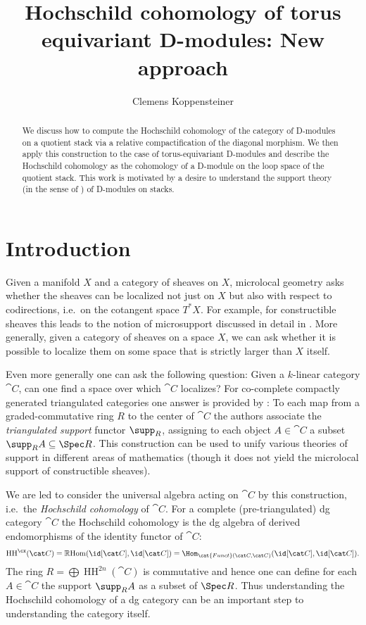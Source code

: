 \documentclass{ck-article}
\title{Hochschild cohomology of torus equivariant D-modules: New approach}
\author{Clemens Koppensteiner}
\newcommand{\HCoh}{\operatorname{HH}^\cx}   %
\begin{document}
\maketitle

\begin{abstract}
    We discuss how to compute the Hochschild cohomology of the category of D-modules on a quotient stack via a relative compactification of the diagonal morphism.
    We then apply this construction to the case of torus-equivariant D-modules and describe the Hochschild cohomology as the cohomology of a D-module on the loop space of the quotient stack.
    This work is motivated by a desire to understand the support theory (in the sense of \cite{BensonIyengarKrause:2008:LocalCohomologyAndSupportForTriangulatedCategories}) of D-modules on stacks.
\end{abstract}

\setcounter{tocdepth}{1}
\tableofcontents

\section{Introduction}

Given a manifold $X$ and a category of sheaves on $X$, microlocal geometry asks whether the sheaves can be localized not just on $X$ but also with respect to codirections, i.e.~on the cotangent space $T^*X$.
For example, for constructible sheaves this leads to the notion of microsupport discussed in detail in \cite{KashiwaraSchapira:1994:SheavesOnManifolds}.
More generally, given a category of sheaves on a space $X$, we can ask whether it is possible to localize them on some space that is strictly larger than $X$ itself.

Even more generally one can ask the following question: Given a $k$-linear category $\cat C$, can one find a space over which $\cat C$ localizes?
For co-complete compactly generated triangulated categories one answer is provided by \cite{BensonIyengarKrause:2008:LocalCohomologyAndSupportForTriangulatedCategories}:
To each map from a graded-commutative ring $R$ to the center of $\cat C$ the authors associate the \emph{triangulated support} functor $\supp_R$, assigning to each object $A ∈ \cat C$ a subset $\supp_R A \subseteq \Spec R$.
This construction can be used to unify various theories of support in different areas of mathematics (though it does not yield the microlocal support of constructible sheaves).

We are led to consider the universal algebra acting on $\cat C$ by this construction, i.e.~the \emph{Hochschild cohomology} of $\cat C$.
For a complete (pre-triangulated) dg category $\cat C$ the Hochschild cohomology is the dg algebra of derived endomorphisms of the identity functor of $\cat C$:
\[
    \HCoh(\cat C)
    = \mathbb{R}\mathrm{Hom}(\id[\cat C], \id[\cat C])
    = \Hom_{\cat{Funct}(\cat C, \cat C)}(\id[\cat C], \id[\cat C]).
\]
The ring $R = \bigoplus \operatorname{HH}^{2n}(\cat C)$ is commutative and hence one can define for each $A ∈ \cat C$ the support $\supp_R A$ as a subset of $\Spec R$.
Thus understanding the Hochschild cohomology of a dg category can be an important step to understanding the category itself.
\end{document}
